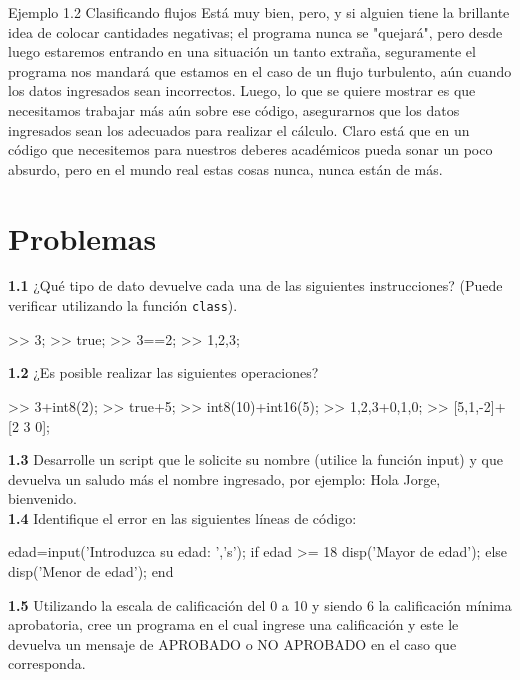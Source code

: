\begin{ejemplo}{Ejemplo 1.2 Clasificando flujos}
Está muy bien, pero, y si alguien tiene la brillante idea de colocar 
cantidades negativas; el programa nunca se "quejará", pero desde luego estaremos 
entrando en una situación un tanto extraña, seguramente el programa nos mandará que 
estamos en el caso de un flujo turbulento, aún cuando los datos ingresados sean incorrectos.
Luego, lo que se quiere mostrar es que necesitamos trabajar más aún sobre ese código, 
asegurarnos que los datos ingresados sean los adecuados para realizar el cálculo. 
Claro está que en un código que necesitemos para nuestros deberes académicos pueda 
sonar un poco absurdo, pero en el mundo real estas cosas nunca, nunca están de más.
\end{ejemplo}

\section*{Problemas}

\textbf{1.1} ¿Qué tipo de dato devuelve cada una de las siguientes
instrucciones? (Puede verificar utilizando la función \texttt{class}).

\begin{matlab}
>> 3;
>> true;
>> 3==2;
>> {1,2,3}; 
\end{matlab}

\textbf{1.2} ¿Es posible realizar las siguientes operaciones?

\begin{matlab}
>> 3+int8(2);
>> true+5;
>> int8(10)+int16(5);
>> {1,2,3}+{0,1,0};
>> [5,1,-2]+[2 3 0];
\end{matlab}

\textbf{1.3} Desarrolle un script que le solicite su nombre (utilice la
función input) y que devuelva un saludo más el nombre ingresado, por
ejemplo: Hola Jorge, bienvenido. \\

\textbf{1.4} Identifique el error en las siguientes líneas de código:

\begin{matlab}
edad=input('Introduzca su edad: ','s');
if edad >= 18
    disp('Mayor de edad');
else
    disp('Menor de edad');
end
\end{matlab}

\textbf{1.5} Utilizando la escala de calificación del 0 a 10 y siendo 6
la calificación mínima aprobatoria, cree un programa en el cual ingrese
una calificación y este le devuelva un mensaje de APROBADO o NO APROBADO
en el caso que corresponda. \\


